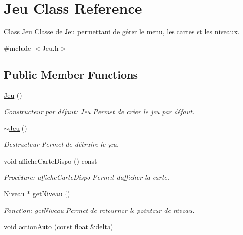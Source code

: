 \hypertarget{classJeu}{}\section{Jeu Class Reference}
\label{classJeu}


Class \hyperlink{classJeu}{Jeu} Classe de \hyperlink{classJeu}{Jeu} permettant de gérer le menu, les cartes et les niveaux.  




{\ttfamily \#include $<$Jeu.\+h$>$}

\subsection*{Public Member Functions}
\begin{DoxyCompactItemize}
\item 
\hyperlink{classJeu_acc5795ee00edf75516d3dfe65be3e6d6}{Jeu} ()
\begin{DoxyCompactList}\small\item\em Constructeur par défaut\+: \hyperlink{classJeu}{Jeu} Permet de créer le jeu par défaut. \end{DoxyCompactList}\item 
\mbox{\label{classJeu_a9cd19e73df169d7f09397be61ba8548c}} 
\hyperlink{classJeu_a9cd19e73df169d7f09397be61ba8548c}{$\sim$\+Jeu} ()
\begin{DoxyCompactList}\small\item\em Destructeur Permet de détruire le jeu. \end{DoxyCompactList}\item 
void \hyperlink{classJeu_a7528edef2101b0abda334ca1d78ea92e}{affiche\+Carte\+Dispo} () const
\begin{DoxyCompactList}\small\item\em Procédure\+: affiche\+Carte\+Dispo Permet d\textquotesingle{}afficher la carte. \end{DoxyCompactList}\item 
\hyperlink{classNiveau}{Niveau} $\ast$ \hyperlink{classJeu_a71bf0b5329ade330d95318b50d1e2f12}{get\+Niveau} ()
\begin{DoxyCompactList}\small\item\em Fonction\+: get\+Niveau Permet de retourner le pointeur de niveau. \end{DoxyCompactList}\item 
void \hyperlink{classJeu_ad6c999b7a302fde5d2f32d88cbb8563c}{action\+Auto} (const float \&delta)

\end{DoxyCompactItemize}
